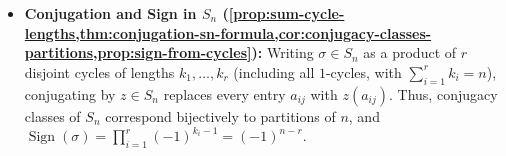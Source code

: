 \begin{overview}
\begin{itemize}
    \item \textbf{Conjugation and Sign in $S_n$ (\cref{prop:sum-cycle-lengths,thm:conjugation-sn-formula,cor:conjugacy-classes-partitions,prop:sign-from-cycles}):} Writing $\sigma \in S_n$ as a product of $r$ disjoint cycles of lengths $k_1, \dots, k_r$ (including all $1$-cycles, with $\sum_{i=1}^r k_i = n$), conjugating by $z \in S_n$ replaces every entry $a_{ij}$ with $z(a_{ij})$. Thus, conjugacy classes of $S_n$ correspond bijectively to partitions of $n$, and $\operatorname{Sign}(\sigma) = \prod_{i=1}^r (-1)^{k_i - 1} = (-1)^{n - r}$.
\end{itemize}
\end{overview}
